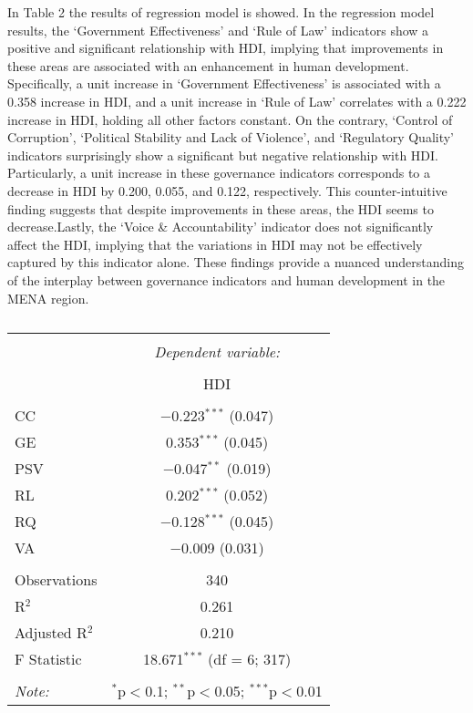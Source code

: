 \documentclass[
  12pt,
]{article}
\begin{document}
In Table 2 the results of regression model is showed. In the regression model results, the `Government Effectiveness' and `Rule of Law' indicators show a positive and significant relationship with HDI, implying that improvements in these areas are associated with an enhancement in human development. Specifically, a unit increase in `Government Effectiveness' is associated with a 0.358 increase in HDI, and a unit increase in `Rule of Law' correlates with a 0.222 increase in HDI, holding all other factors constant. On the contrary, `Control of Corruption', `Political Stability and Lack of Violence', and `Regulatory Quality' indicators surprisingly show a significant but negative relationship with HDI. Particularly, a unit increase in these governance indicators corresponds to a decrease in HDI by 0.200, 0.055, and 0.122, respectively.
This counter-intuitive finding suggests that despite improvements in these areas, the HDI seems to decrease.Lastly, the `Voice \& Accountability' indicator does not significantly affect the HDI, implying that the variations in HDI may not be effectively captured by this indicator alone. These findings provide a nuanced understanding of the interplay between governance indicators and human development in the MENA region.

\begin{table}[!htbp] \centering 
  \caption{} 
  \label{} 
\begin{tabular}{@{\extracolsep{5pt}}lc} 
\\[-1.8ex]\hline 
\hline \\[-1.8ex] 
 & \multicolumn{1}{c}{\textit{Dependent variable:}} \\ 
\cline{2-2} 
\\[-1.8ex] & HDI \\ 
\hline \\[-1.8ex] 
 CC & $-$0.223$^{***}$ (0.047) \\ 
  GE & 0.353$^{***}$ (0.045) \\ 
  PSV & $-$0.047$^{**}$ (0.019) \\ 
  RL & 0.202$^{***}$ (0.052) \\ 
  RQ & $-$0.128$^{***}$ (0.045) \\ 
  VA & $-$0.009 (0.031) \\ 
 \hline \\[-1.8ex] 
Observations & 340 \\ 
R$^{2}$ & 0.261 \\ 
Adjusted R$^{2}$ & 0.210 \\ 
F Statistic & 18.671$^{***}$ (df = 6; 317) \\ 
\hline 
\hline \\[-1.8ex] 
\textit{Note:}  & \multicolumn{1}{r}{$^{*}$p$<$0.1; $^{**}$p$<$0.05; $^{***}$p$<$0.01} \\ 
\end{tabular} 
\end{table}
\end{document}
